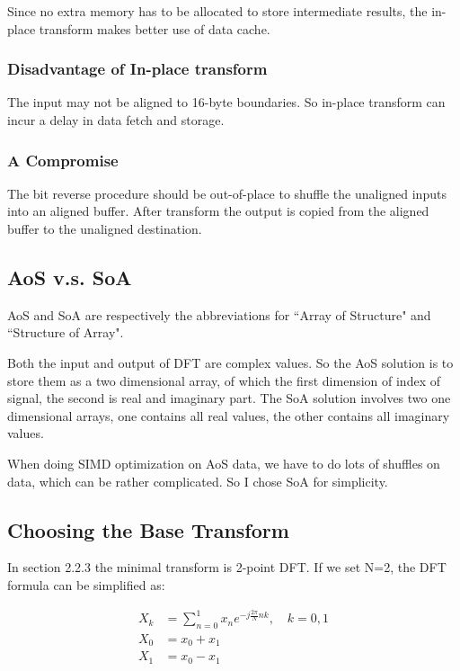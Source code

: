 \documentclass[a4paper]{report}
\begin{document}
	Since no extra memory has to be allocated to store intermediate results, the in-place transform makes better use of data cache.

\subsubsection{Disadvantage of In-place transform} \indent

	The input may not be aligned to 16-byte boundaries. So in-place transform can incur a delay in data fetch and storage.

\subsubsection{A Compromise} \indent

	The bit reverse procedure should be out-of-place to shuffle the unaligned inputs into an aligned buffer. After transform the output is copied from the aligned buffer to the unaligned destination.

\subsection{AoS v.s. SoA} \indent

	AoS and SoA are respectively the abbreviations for ``Array of Structure" and ``Structure of Array".
	
	Both the input and output of DFT are complex values. So the AoS solution is to store them as a two dimensional array, of which the first dimension of index of signal, the second is real and imaginary part. The SoA solution involves two one dimensional arrays, one contains all real values, the other contains all imaginary values.

	When doing SIMD optimization on AoS data, we have to do lots of shuffles on data, which can be rather complicated. So I chose SoA for simplicity.
	
\subsection{Choosing the Base Transform} \indent

	In section 2.2.3 the minimal transform is 2-point DFT. If we set N=2, the DFT formula can be simplified as:

\begin{align*}
	X_k &= \sum^{1}_{n=0} x_n e^{-j\frac{2\pi}{N}nk}, \quad k = 0, 1 \\
	X_0 &= x_0 + x_1 \\
	X_1 &= x_0 - x_1
\end{align*}
\end{document}
